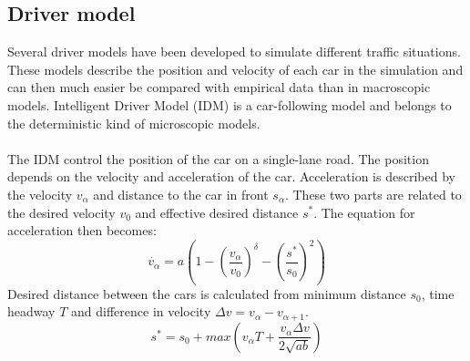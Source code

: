 \subsection{Driver model}
Several driver models have been developed to simulate different traffic
situations. These models describe the position and velocity of each car in
the simulation and can then much easier be compared with empirical data than
in macroscopic models. Intelligent Driver Model (IDM) is a car-following
model and belongs to the deterministic kind of microscopic models.\\\\

The IDM control the position of the car on a single-lane road. The position depends on the velocity and acceleration of the car. Acceleration is described by the velocity \begin{math}v_\alpha\end{math} and distance to the car in front \begin{math}s_\alpha\end{math}. These two parts are related to the desired velocity \begin{math}v_0\end{math} and effective desired distance \begin{math}s^\ast\end{math}. The equation for acceleration then becomes:
\begin{equation}\dot{v_\alpha} = a(1-(\frac{v_\alpha}{v_0})^\delta-(\frac{s^\ast}{s_0})^2)\end{equation}
Desired distance between the cars is calculated from minimum distance \begin{math}s_0\end{math}, time headway \begin{math}T\end{math} and difference in velocity \begin{math}\Delta v = v_\alpha - v_{\alpha + 1}\end{math}.
\begin{equation}\label{desireddist}s^\ast = s_0 + max(v_\alpha T + \frac{v_\alpha \Delta v}{2\sqrt{ab}})\end{equation}
